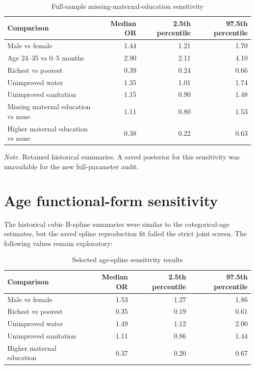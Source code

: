 \documentclass[10pt]{article}
\begin{document}
\begin{table}[H]
\centering
\caption{Full-sample missing-maternal-education sensitivity}
\small
\begin{tabular}{lrrr}
\toprule
Comparison & Median OR & 2.5th percentile & 97.5th percentile \\
\midrule
Male vs female & 1.44 & 1.21 & 1.70 \\
Age 24--35 vs 0--5 months & 2.90 & 2.11 & 4.10 \\
Richest vs poorest & 0.39 & 0.24 & 0.66 \\
Unimproved water & 1.35 & 1.01 & 1.74 \\
Unimproved sanitation & 1.15 & 0.90 & 1.48 \\
Missing maternal education vs none & 1.11 & 0.80 & 1.53 \\
Higher maternal education vs none & 0.38 & 0.22 & 0.63 \\
\bottomrule
\end{tabular}
\begin{minipage}{0.98\textwidth}\footnotesize \textit{Note.} Retained historical summaries. A saved posterior for this sensitivity was unavailable for the new full-parameter audit.\end{minipage}
\end{table}

\section{Age functional-form sensitivity}

The historical cubic B-spline summaries were similar to the categorical-age estimates, but the saved spline reproduction fit failed the strict joint screen. The following values remain exploratory:

\begin{table}[H]
\centering
\caption{Selected age-spline sensitivity results}
\begin{tabular}{lrrr}
\toprule
Comparison & Median OR & 2.5th percentile & 97.5th percentile \\
\midrule
Male vs female & 1.53 & 1.27 & 1.86 \\
Richest vs poorest & 0.35 & 0.19 & 0.61 \\
Unimproved water & 1.49 & 1.12 & 2.00 \\
Unimproved sanitation & 1.11 & 0.86 & 1.44 \\
Higher maternal education & 0.37 & 0.20 & 0.67 \\
\bottomrule
\end{tabular}
\end{table}
\end{document}
